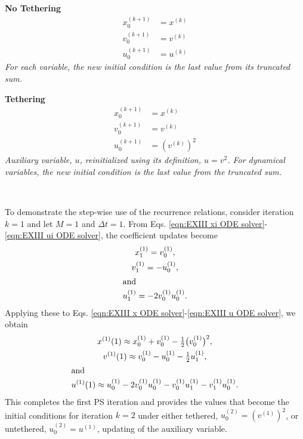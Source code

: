 \documentclass{article}
\begin{document}
\noindent
\begin{minipage}{0.48\textwidth}
\textbf{No Tethering}
    \begin{align*}
        x_0^{(k+1)} &= x^{(k)}\\
        v_0^{(k+1)} &= v^{(k)}\\
        u_0^{(k+1)} &= u^{(k)}
    \end{align*}
\emph{For each variable, the new initial condition is the last value from its truncated sum.\\}
\end{minipage}\hfill
\begin{minipage}{0.48\textwidth}
\textbf{Tethering}
    \begin{align*}
        x_0^{(k+1)} &= x^{(k)}\\
        v_0^{(k+1)} &= v^{(k)}\\
        u_0^{(k+1)} &= \left(v^{(k)}\right)^2
    \end{align*}
\emph{Auxiliary variable, $u$, reinitialized using its definition, $u=v^2$. For dynamical variables, the new initial condition is the last value from the truncated sum.}
\end{minipage}\\
\newline


To demonstrate the step-wise use of the recurrence relations, consider iteration $k=1$ and let $M=1$ and $\Delta t=1$.  From Eqs. \eqref{eqn:EXIII xi ODE solver}-\eqref{eqn:EXIII ui ODE solver}, the coefficient updates become
    \begin{gather*}
        x_{1}^{(1)}=v_0^{(1)}, \\
        v_{1}^{(1)}=-u_0^{(1)},  \\
\intertext{and}
        u_{1}^{(1)}=-2v_0^{(1)}u_{0}^{(1)}.
    \end{gather*}
Applying these to Eqs. \eqref{eqn:EXIII x ODE solver}-\eqref{eqn:EXIII u ODE solver}, we obtain
    \begin{gather*}
        x^{(1)}(1) \approx x_0^{(1)} + v_0^{(1)}
        - \tfrac12\big(v_0^{(1)}\big)^{2},\\
        v^{(1)}(1) \approx v_0^{(1)} - u_0^{(1)} - \tfrac12 u_1^{(1)},\\
\intertext{and}
        u^{(1)}(1) \approx  u_0^{(1)} - 2v_0^{(1)}u_0^{(1)} - v_0^{(1)}u_1^{(1)} - v_1^{(1)}u_0^{(1)}.
    \end{gather*}
This completes the first PS iteration and provides the values that become the initial conditions for iteration $k=2$ under either tethered, $u_0^{(2)}=(v^{(1)})^2$, or untethered, $u_0^{(2)}=u^{(1)}$, updating of the auxiliary variable.
\end{document}
